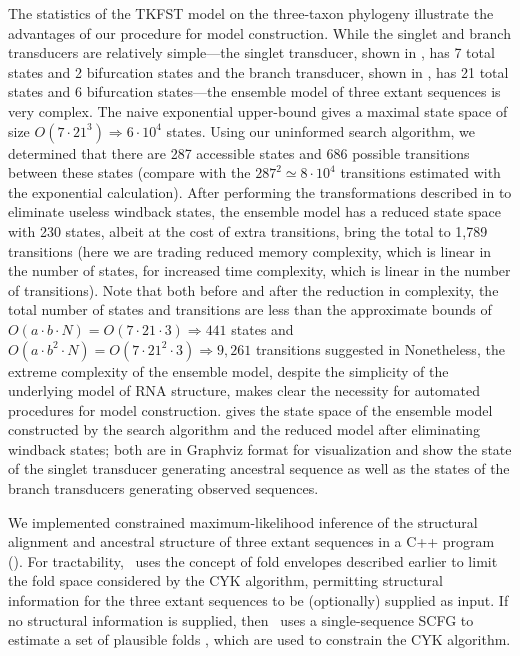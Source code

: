 \documentclass[10pt]{article}
\begin{document}
The statistics of the TKFST model on the three-taxon phylogeny
illustrate the advantages of our procedure for model construction.
While the singlet and branch transducers are relatively simple---the
singlet transducer, shown in , has 7 total states
and 2 bifurcation states and the branch transducer, shown in
, has 21 total states and 6 bifurcation
states---the ensemble model of three extant sequences is very complex.
The naive exponential upper-bound gives a maximal state space of size
$O(7 \cdot 21^{3}) \Rightarrow 6 \cdot 10^4$ states.  Using our
uninformed search algorithm, we determined that there are 287
accessible states and 686 possible transitions between these states
(compare with the $287^2 \simeq 8 \cdot 10^4$ transitions estimated
with the exponential calculation).  After performing the
transformations described in  to
eliminate useless windback states, the ensemble model has a reduced
state space with 230 states, albeit at the cost of extra transitions,
bring the total to 1,789 transitions (here we are trading reduced
memory complexity, which is linear in the number of states, for
increased time complexity, which is linear in the number of
transitions).  Note that both before and after the reduction in
complexity, the total number of states and transitions are less than
the approximate bounds of $O(a \cdot b \cdot N) = O(7 \cdot 21 \cdot
3) \Rightarrow 441$ states and $O(a \cdot b^2 \cdot N) = O(7 \cdot
21^2 \cdot 3) \Rightarrow 9,261$ transitions suggested in 
 Nonetheless, the extreme complexity of the
ensemble model, despite the simplicity of the underlying model of RNA
structure, makes clear the necessity for automated procedures for
model construction.   gives the state space of the ensemble
model constructed by the search algorithm and  the reduced
model after eliminating windback states; both are in Graphviz format for
visualization and show the state of the singlet transducer generating
ancestral sequence as well as the states of the branch transducers
generating observed sequences.

We implemented constrained maximum-likelihood inference of the structural alignment 
and ancestral structure of three extant sequences in a C++ program (\indiegram).
For tractability, \indiegram\ uses the concept of fold envelopes
described earlier to limit the fold space considered by the CYK algorithm,
permitting structural information for the three extant sequences to be
(optionally) supplied as input.
If no structural information is supplied, then \indiegram\
uses a single-sequence SCFG to estimate a set of plausible folds \cite{Holmes2005},
which are used to constrain the CYK algorithm.
\end{document}
